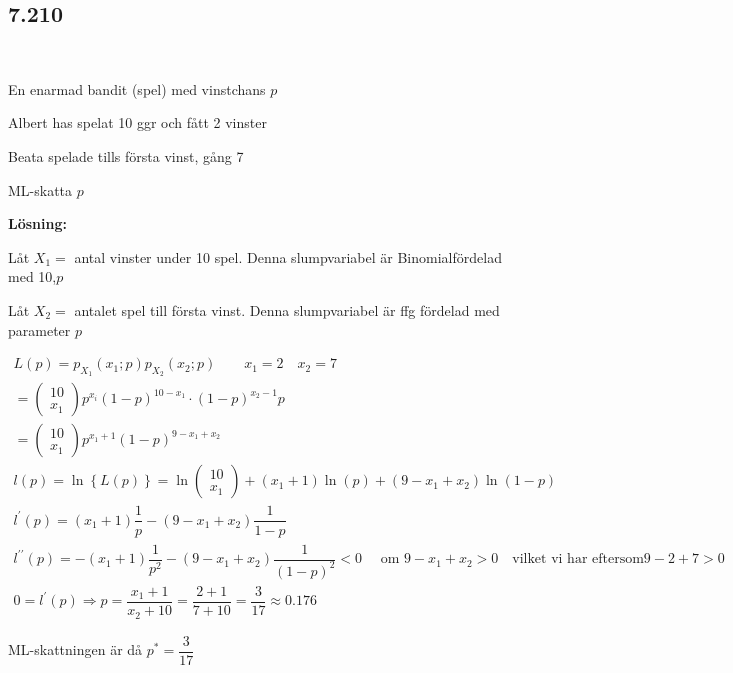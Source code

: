 \subsection{7.210}\hfill\\\par
\noindent En enarmad bandit (spel) med vinstchans $p$\par
\noindent Albert has spelat 10 ggr och fått 2 vinster\par
\noindent Beata spelade tills första vinst, gång 7\par
\noindent ML-skatta $p$
\par\bigskip
\noindent\textbf{Lösning:}\par
\noindent Låt $X_1 = $ antal vinster under 10 spel. Denna slumpvariabel är Binomialfördelad med 10,$p$\par
\noindent Låt $X_2 = $ antalet spel till första vinst. Denna slumpvariabel är ffg fördelad med parameter $p$
\par\bigskip

\begin{equation*}
  \begin{gathered}
    L(p) = p_{X_1}(x_1;p)p_{X_2}(x_2;p)\qquad x_1 = 2\quad x_2 = 7\\
    = \begin{pmatrix}10\\x_1\end{pmatrix}p^{x_i}(1-p)^{10-x_1}\cdot (1-p)^{x_2-1}p\\
    = \begin{pmatrix}10\\x_1\end{pmatrix}p^{x_1+1}(1-p)^{9-x_1+x_2}\\
  l(p) = \ln\left\{L(p)\right\} = \ln\begin{pmatrix}10\\x_1\end{pmatrix}+(x_1+1)\ln(p)+(9-x_1+x_2)\ln(1-p)\\
  l^{\prime}(p) = (x_1+1)\dfrac{1}{p}-(9-x_1+x_2)\dfrac{1}{1-p}\\
  l^{\prime\prime}(p) = -\left(x_1+1\right)\dfrac{1}{p^2}-(9-x_1+x_2)\dfrac{1}{(1-p)^2}<0\quad\text{ om } 9-x_1+x_2>0\quad\text{vilket vi har eftersom}9-2+7>0\\
  0 = l^{\prime}(p)\Rightarrow p = \dfrac{x_1+1}{x_2+10} = \dfrac{2+1}{7+10} = \dfrac{3}{17} \approx 0.176
  \end{gathered}
\end{equation*}
\par\bigskip
\noindent ML-skattningen är då $p^* = \dfrac{3}{17}$
\par\bigskip
